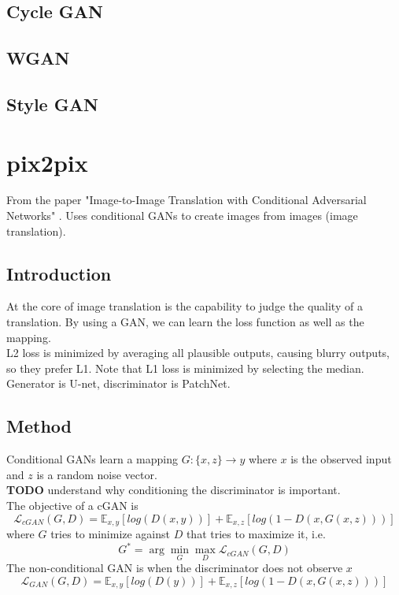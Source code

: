 \documentclass[../main.tex]{subfiles}
\begin{document}
\subsection{Cycle GAN}
\subsection{WGAN}

\subsection{Style GAN}



\section{pix2pix}
From the paper "Image-to-Image Translation with Conditional Adversarial Networks" \cite{pix-to-pix}.
Uses conditional GANs to create images from images (image translation).


\subsection{Introduction}
At the core of image translation is the capability to judge the quality of a translation. By using a GAN,
we can learn the loss function as well as the mapping. \\
L2 loss is minimized by averaging all plausible outputs, causing blurry outputs, so they prefer L1.
Note that L1 loss is minimized by selecting the median. \\
Generator is U-net, discriminator is PatchNet.

\subsection{Method}
Conditional GANs learn a mapping $G: \{x, z\} \rightarrow y$ where $x$ is the observed input and $z$
is a random noise vector. \\
\textbf{TODO} understand why conditioning the discriminator is important. \\
The objective of a cGAN is
\begin{equation}
    \mathcal{L}_{cGAN}(G, D) = \mathbb{E}_{x,y}[log(D(x,y))] + \mathbb{E}_{x,z}[log(1-D(x, G(x, z)))]
\end{equation}
where $G$ tries to minimize against $D$ that tries to maximize it, i.e.
\begin{equation}
    G^* = \arg \min_G \max_D \mathcal{L}_{cGAN}(G, D)
\end{equation}
The non-conditional GAN is when the discriminator does not observe $x$
\begin{equation}
    \mathcal{L}_{GAN}(G, D) = \mathbb{E}_{x,y}[log(D(y))] + \mathbb{E}_{x,z}[log(1-D(x, G(x, z)))]
\end{equation}
\end{document}
